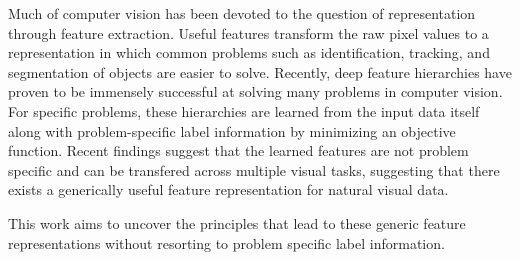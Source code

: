 Much of computer vision has been devoted to the question of representation
through feature extraction.  Useful features transform the raw pixel values to
a representation in which common problems such as identification, tracking, and
segmentation of objects are easier to solve. Recently, deep feature hierarchies
have proven to be immensely successful at solving many problems in computer
vision. For specific problems, these hierarchies are learned from the input
data itself along with problem-specific label information by minimizing an
objective function.  Recent findings suggest that the learned features are not
problem specific and can be transfered across multiple visual tasks, suggesting
that there exists a generically useful feature representation for natural
visual data.    

This work aims to uncover the principles that lead to these generic feature
representations without resorting to problem specific label information. 
